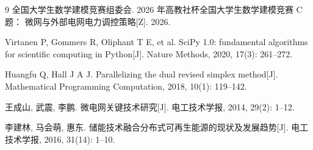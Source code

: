 \documentclass[withoutpreface,bwprint]{cumcmthesis}
\begin{document}
\begin{thebibliography}{9}
  \small
  \setlength{\itemsep}{0pt plus 1pt}
  全国大学生数学建模竞赛组委会. 2026 年高教社杯全国大学生数学建模竞赛 C 题：
  微网与外部电网电力调控策略[Z]. 2026.

  Virtanen P, Gommers R, Oliphant T E, et al. SciPy 1.0: fundamental algorithms
  for scientific computing in Python[J]. Nature Methods, 2020, 17(3): 261--272.

  Huangfu Q, Hall J A J. Parallelizing the dual revised simplex method[J].
  Mathematical Programming Computation, 2018, 10(1): 119--142.

  王成山, 武震, 李鹏. 微电网关键技术研究[J]. 电工技术学报, 2014, 29(2): 1--12.

  李建林, 马会萌, 惠东. 储能技术融合分布式可再生能源的现状及发展趋势[J].
  电工技术学报, 2016, 31(14): 1--10.
\end{thebibliography}
\end{document}
